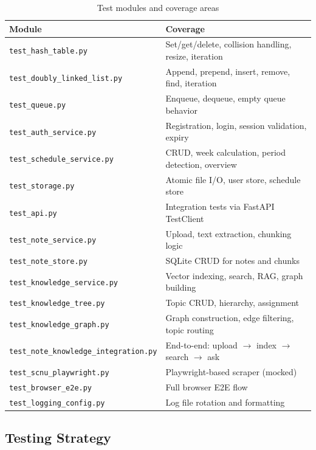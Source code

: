 \documentclass[12pt,a4paper]{article}
\begin{document}
\begin{table}[H]
\centering
\caption{Test modules and coverage areas}
\begin{tabular}{@{}lp{8cm}@{}}
\toprule
\textbf{Module} & \textbf{Coverage} \\
\midrule
\texttt{test\_hash\_table.py} & Set/get/delete, collision handling, resize, iteration \\
\texttt{test\_doubly\_linked\_list.py} & Append, prepend, insert, remove, find, iteration \\
\texttt{test\_queue.py} & Enqueue, dequeue, empty queue behavior \\
\texttt{test\_auth\_service.py} & Registration, login, session validation, expiry \\
\texttt{test\_schedule\_service.py} & CRUD, week calculation, period detection, overview \\
\texttt{test\_storage.py} & Atomic file I/O, user store, schedule store \\
\texttt{test\_api.py} & Integration tests via FastAPI TestClient \\
\texttt{test\_note\_service.py} & Upload, text extraction, chunking logic \\
\texttt{test\_note\_store.py} & SQLite CRUD for notes and chunks \\
\texttt{test\_knowledge\_service.py} & Vector indexing, search, RAG, graph building \\
\texttt{test\_knowledge\_tree.py} & Topic CRUD, hierarchy, assignment \\
\texttt{test\_knowledge\_graph.py} & Graph construction, edge filtering, topic routing \\
\texttt{test\_note\_knowledge\_integration.py} & End-to-end: upload $\to$ index $\to$ search $\to$ ask \\
\texttt{test\_scnu\_playwright.py} & Playwright-based scraper (mocked) \\
\texttt{test\_browser\_e2e.py} & Full browser E2E flow \\
\texttt{test\_logging\_config.py} & Log file rotation and formatting \\
\bottomrule
\end{tabular}
\end{table}

\subsection{Testing Strategy}
\end{document}
